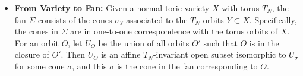 \begin{theorem}
\begin{itemize}
    \item \textbf{From Variety to Fan:} Given a normal toric variety $X$ with torus $T_N$, the fan $\Sigma$ consists of the cones $\sigma_Y$ associated to the $T_N$-orbits $Y \subset X$. Specifically, the cones in $\Sigma$ are in one-to-one correspondence with the torus orbits of $X$. For an orbit $O$, let $U_O$ be the union of all orbits $O'$ such that $O$ is in the closure of $O'$. Then $U_O$ is an affine $T_N$-invariant open subset isomorphic to $U_\sigma$ for some cone $\sigma$, and this $\sigma$ is the cone in the fan corresponding to $O$.
\end{itemize}



\end{theorem}